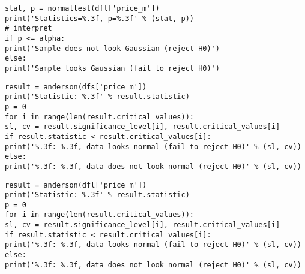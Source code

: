 \documentclass[]{scrreprt}
\begin{document}
%
\begin{lstlisting}[float, caption = Performing the D'Agostino's K-squared test for Leningrad Region data, firstnumber=1, label= lst:K^2-D'Agostino-test-lo]
stat, p = normaltest(dfl['price_m'])
print('Statistics=%.3f, p=%.3f' % (stat, p))
# interpret
if p <= alpha:
print('Sample does not look Gaussian (reject H0)')
else:
print('Sample looks Gaussian (fail to reject H0)')
\end{lstlisting}  
%
\begin{lstlisting}[float, caption = Performing the Anderson-Darling test for St.~Petersburg data, firstnumber=1, label= lst:Anderon-Darling-test-spb]
result = anderson(dfs['price_m'])
print('Statistic: %.3f' % result.statistic)
p = 0
for i in range(len(result.critical_values)):
sl, cv = result.significance_level[i], result.critical_values[i]
if result.statistic < result.critical_values[i]:
print('%.3f: %.3f, data looks normal (fail to reject H0)' % (sl, cv))
else:
print('%.3f: %.3f, data does not look normal (reject H0)' % (sl, cv))
\end{lstlisting}
%
\begin{lstlisting}[float, caption = Performing the Anderson-Darling test for Leningrad Region data, firstnumber=1, label= lst:Anderon-Darling-test-lo]
result = anderson(dfl['price_m'])
print('Statistic: %.3f' % result.statistic)
p = 0
for i in range(len(result.critical_values)):
sl, cv = result.significance_level[i], result.critical_values[i]
if result.statistic < result.critical_values[i]:
print('%.3f: %.3f, data looks normal (fail to reject H0)' % (sl, cv))
else:
print('%.3f: %.3f, data does not look normal (reject H0)' % (sl, cv))
\end{lstlisting}  
%
\end{document}
